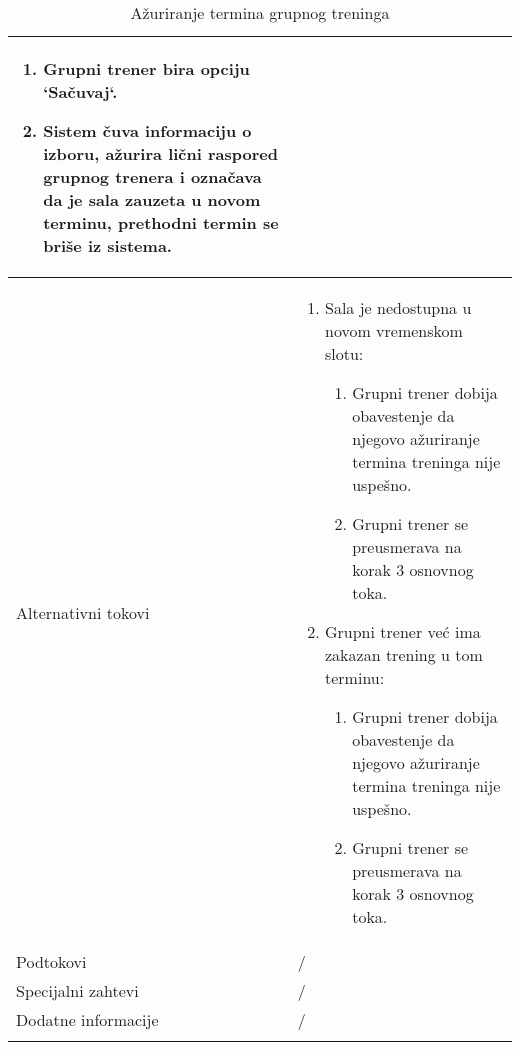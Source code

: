 \documentclass[../grupniTreninzi.tex]{subfiles}
\begin{document}
\begin{longtable}{| p{} | p{} |}
\begin{enumerate}
        \item Grupni trener bira opciju `Sačuvaj`.
        \item Sistem čuva informaciju o izboru, ažurira lični raspored grupnog trenera i označava da je sala zauzeta u novom terminu, prethodni termin se briše iz sistema.
    \end{enumerate}\\
\hline
    Alternativni tokovi & 
       \begin{enumerate}
        \item Sala je nedostupna u novom vremenskom slotu:
            \begin{enumerate}
                \item Grupni trener dobija obavestenje da njegovo ažuriranje termina treninga nije uspešno.
                \item Grupni trener se preusmerava na korak 3 osnovnog toka.
            \end{enumerate}    
        \item Grupni trener već ima zakazan trening u tom terminu:
            \begin{enumerate}
                \item Grupni trener dobija obavestenje da njegovo ažuriranje termina treninga nije uspešno.
                \item Grupni trener se preusmerava na korak 3 osnovnog toka.
            \end{enumerate}    
    \end{enumerate}\\
\hline
    Podtokovi & /\\
\hline
    Specijalni zahtevi & /\\
\hline
    Dodatne informacije & /\\
\hline
\caption{Ažuriranje termina grupnog treninga} %
\end{longtable}
\end{document}
